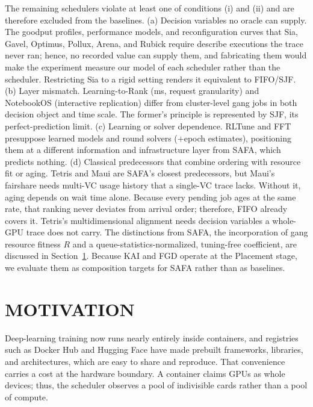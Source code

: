 \documentclass{ieeetj}
\begin{document}
The remaining schedulers violate at least one of conditions (i) and (ii) and are therefore excluded from the baselines. (a) Decision variables no oracle can supply. The goodput profiles, performance models, and reconfiguration curves that Sia, Gavel\cite{narayanan2020gavel}, Optimus, Pollux, Arena, and Rubick require describe executions the trace never ran; hence, no recorded value can supply them, and fabricating them would make the experiment measure our model of each scheduler rather than the scheduler. Restricting Sia to a rigid setting renders it equivalent to FIFO/SJF. (b) Layer mismatch. Learning-to-Rank (ms, request granularity) and NotebookOS (interactive replication) differ from cluster-level gang jobs in both decision object and time scale. The former's principle is represented by SJF, its perfect-prediction limit. (c) Learning or solver dependence. RLTune and FFT presuppose learned models and round solvers ($+$epoch estimates), positioning them at a different information and infrastructure layer from SAFA, which predicts nothing. (d) Classical predecessors that combine ordering with resource fit or aging. Tetris\cite{grandl2014multi} and Maui\cite{jackson2001maui} are SAFA's closest predecessors, but Maui's fairshare needs multi-VC usage history that a single-VC trace lacks. Without it, aging depends on wait time alone. Because every pending job ages at the same rate, that ranking never deviates from arrival order; therefore, FIFO already covers it. Tetris's multidimensional alignment needs decision variables a whole-GPU trace does not carry. The distinctions from SAFA, the incorporation of gang resource fitness $R$ and a queue-statistics-normalized, tuning-free coefficient, are discussed in Section~\ref{motivation}. Because KAI and FGD operate at the Placement stage, we evaluate them as composition targets for SAFA rather than as baselines.

\section{MOTIVATION}\label{motivation}
Deep-learning training now runs nearly entirely inside containers\cite{b7}, and registries such as Docker Hub\cite{b8} and Hugging Face\cite{b9} have made prebuilt frameworks, libraries, and architectures, which are easy to share and reproduce. That convenience carries a cost at the hardware boundary. A container claims GPUs as whole devices; thus, the scheduler observes a pool of indivisible cards rather than a pool of compute.
\end{document}
